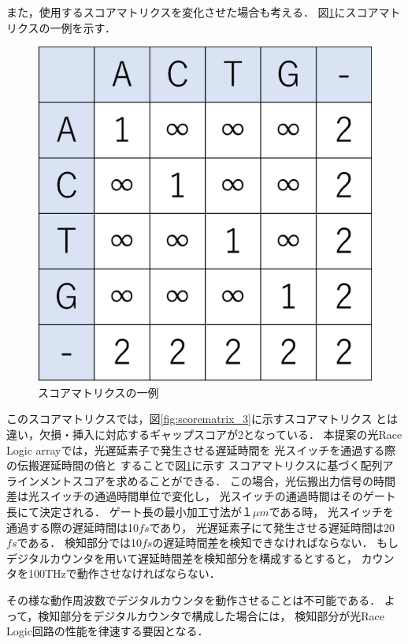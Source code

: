 また，使用するスコアマトリクスを変化させた場合も考える．
図\ref{fig:scorematrix_4}にスコアマトリクスの一例を示す．
\begin{figure}[t!]
\begin{center}
\includegraphics[keepaspectratio,scale=0.4]{fig/5/scorematrix_4.eps}
\caption{スコアマトリクスの一例}
\label{fig:scorematrix_4}
\end{center}
\end{figure}
このスコアマトリクスでは，図\ref{fig:scorematrix_3}に示すスコアマトリクス
とは違い，欠損・挿入に対応するギャップスコアが2となっている．
本提案の光Race Logic arrayでは，光遅延素子で発生させる遅延時間を
光スイッチを通過する際の伝搬遅延時間の倍と
することで図\ref{fig:scorematrix_4}に示す
スコアマトリクスに基づく配列アラインメントスコアを求めることができる．
この場合，光伝搬出力信号の時間差は光スイッチの通過時間単位で変化し，
光スイッチの通過時間はそのゲート長にて決定される．
ゲート長の最小加工寸法が１$\mu m$である時，
光スイッチを通過する際の遅延時間は10$fs$であり，
光遅延素子にて発生させる遅延時間は20$fs$である．
検知部分では10$fs$の遅延時間差を検知できなければならない．
もしデジタルカウンタを用いて遅延時間差を検知部分を構成するとすると，
カウンタを100THzで動作させなければならない．

その様な動作周波数でデジタルカウンタを動作させることは不可能である．
よって，検知部分をデジタルカウンタで構成した場合には，
検知部分が光Race Logic回路の性能を律速する要因となる．

